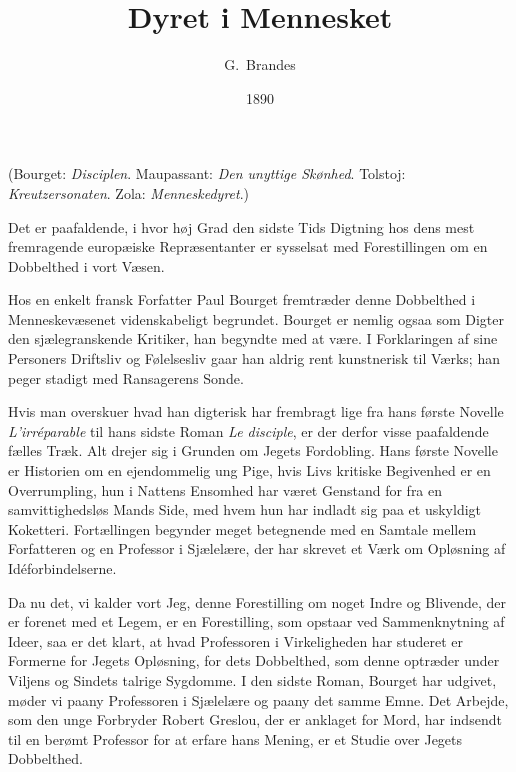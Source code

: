 \documentclass[12pt,a4paper]{article}
\title{\textbf{Dyret i Mennesket}}
\author{G.\ Brandes}
\date{1890}
\begin{document}
\maketitle
\thispagestyle{fancy}

\begin{center}
  \small (Bourget: \textit{Disciplen}. Maupassant: \textit{Den unyttige Skønhed}.
  Tolstoj: \textit{Kreutzersonaten}. Zola: \textit{Menneskedyret}.)
\end{center}

\bigskip

\noindent Det er paafaldende, i hvor høj Grad den sidste Tids Digtning
hos dens mest fremragende europæiske Repræsentanter er sysselsat med
Forestillingen om en Dobbelthed i vort Væsen.

Hos en enkelt fransk Forfatter Paul Bourget fremtræder denne Dobbelthed
i Menneskevæsenet videnskabeligt begrundet. Bourget er nemlig ogsaa som
Digter den sjælegranskende Kritiker, han begyndte med at være. I
Forklaringen af sine Personers Driftsliv og Følelsesliv gaar han aldrig
rent kunstnerisk til Værks; han peger stadigt med Ransagerens Sonde.

Hvis man overskuer hvad han digterisk har frembragt lige fra hans første
Novelle \textit{L'irréparable} til hans sidste Roman \textit{Le disciple},
er der derfor visse paafaldende fælles Træk. Alt drejer sig i Grunden om
Jegets Fordobling. Hans første Novelle er Historien om en ejendommelig ung
Pige, hvis Livs kritiske Begivenhed er en Overrumpling, hun i Nattens
Ensomhed har været Genstand for fra en samvittighedsløs Mands Side, med
hvem hun har indladt sig paa et uskyldigt Koketteri. Fortællingen begynder
meget betegnende med en Samtale mellem Forfatteren og en Professor i
Sjælelære, der har skrevet et Værk om Opløsning af Idéforbindelserne.

Da nu det, vi kalder vort Jeg, denne Forestilling om noget Indre og
Blivende, der er forenet med et Legem, er en Forestilling, som opstaar
ved Sammenknytning af Ideer, saa er det klart, at hvad Professoren i
Virkeligheden har studeret er Formerne for Jegets Opløsning, for dets
Dobbelthed, som denne optræder under Viljens og Sindets talrige Sygdomme.
I den sidste Roman, Bourget har udgivet, møder vi paany Professoren i
Sjælelære og paany det samme Emne. Det Arbejde, som den unge Forbryder
Robert Greslou, der er anklaget for Mord, har indsendt til en berømt
Professor for at erfare hans Mening, er et Studie over Jegets Dobbelthed.
\end{document}
